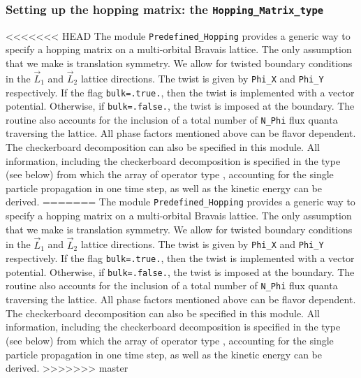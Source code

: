


\subsubsection{Setting up the hopping matrix: the \texttt{Hopping\_Matrix\_type}}\label{sec:hopping_type}

<<<<<<< HEAD
The module \texttt{Predefined\_Hopping}   provides a   generic way to   specify a  hopping matrix on a  multi-orbital   Bravais lattice.  The only  assumption that we make is  translation symmetry.   We   allow  for twisted  boundary conditions in the $\vec{L}_1$ and $\vec{L}_2$ lattice directions. The twist is given by  \texttt{Phi\_X}  and \texttt{Phi\_Y}  respectively.  If the flag  \texttt{bulk=.true.}, then the twist is implemented with a vector potential. Otherwise, if  \texttt{bulk=.false.}, the twist is imposed at the boundary. The routine also accounts for  the inclusion of a  total number of \texttt{N\_Phi}  flux quanta traversing the lattice.  All phase factors mentioned above can be flavor dependent.   The checkerboard decomposition can also be specified in this module.
All information, including the checkerboard decomposition is specified in the     type (see below) from which  the array of  operator type ,   accounting for the single particle propagation in one time step,  as well as the kinetic energy can be derived.    
=======
The module \texttt{Predefined\_Hopping}   provides a   generic way to   specify a  hopping matrix on a  multi-orbital   Bravais lattice.  The only  assumption that we make is  translation symmetry.   We   allow  for twisted  boundary conditions in the $\vec{L}_1$ and $\vec{L}_2$ lattice directions. The twist is given by  \texttt{Phi\_X}  and \texttt{Phi\_Y}  respectively.  If the flag  \texttt{bulk=.true.}, then the twist is implemented with a vector potential. Otherwise, if  \texttt{bulk=.false.}, the twist is imposed at the boundary. The routine also accounts for  the inclusion of a  total number of \texttt{N\_Phi}  flux quanta traversing the lattice.  All phase factors mentioned above can be flavor dependent.   The checkerboard decomposition can also be specified in this module.      All information, including the checkerboard decomposition is specified in the     type (see below) from which  the array of  operator type ,   accounting for the single particle propagation in one time step,  as well as the kinetic energy can be derived.    
>>>>>>> master

